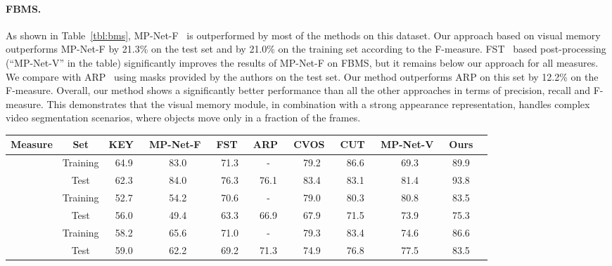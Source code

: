 \paragraph{\bf FBMS.}
As shown in Table~\ref{tbl:bms}, MP-Net-F~\cite{tokmakov2016learning} is
outperformed by most of the methods on this dataset. Our approach based on
visual memory outperforms MP-Net-F by 21.3\% on the test set and by 21.0\%
on the training set according to the F-measure. FST~\cite{papazoglou2013fast}
based post-processing (``MP-Net-V'' in the table) significantly improves the
results of MP-Net-F on FBMS, but it remains below our approach for all
measures. We compare with ARP~\cite{kohprimary} using masks provided by the
authors on the test set. Our method outperforms ARP on this set by
12.2\% on the F-measure. Overall, our method shows a significantly better
performance than all the other approaches in terms of precision, recall and
F-measure. This demonstrates that the visual memory module, in combination with
a strong appearance representation, handles complex video segmentation
scenarios, where objects move only in a fraction of the frames.
\begin{table*}[t]
\begin{center}
\begin{tabular}{c|c|c c c c c c c c c }
\hline
Measure & Set & KEY~\cite{lee2011key} & MP-Net-F~\cite{tokmakov2016learning} & FST~\cite{papazoglou2013fast} & ARP~\cite{kohprimary} & CVOS~\cite{taylor2015causal}  & CUT~\cite{keuper2015motion} & MP-Net-V~\cite{tokmakov2016learning} & Ours \\
\hline
\multirow{2}{*}{} & Training & 64.9 & 83.0 & 71.3 & - & 79.2 & 86.6 & 69.3 & 89.9 \\
& Test & 62.3 & 84.0 & 76.3 & 76.1 & 83.4 & 83.1 & 81.4 & 93.8 \\
\hline 
\multirow{2}{*}{} & Training & 52.7 & 54.2 & 70.6 & - & 79.0 & 80.3 & 80.8 & 83.5 \\
 & Test & 56.0 & 49.4 & 63.3 & 66.9 & 67.9  & 71.5 & 73.9 & 75.3 \\
\hline
\multirow{2}{*}{} & Training & 58.2 & 65.6 & 71.0 & - & 79.3& 83.4 & 74.6 & 86.6 \\
 & Test & 59.0 & 62.2 & 69.2 & 71.3 & 74.9 & 76.8 & 77.5 & 83.5 \\
\hline
\end{tabular}
\caption{Comparison to the state-of-the-art methods on FBMS with precision
(), recall (), and F-measure ().}
\label{tbl:bms}
\end{center}
\end{table*}

